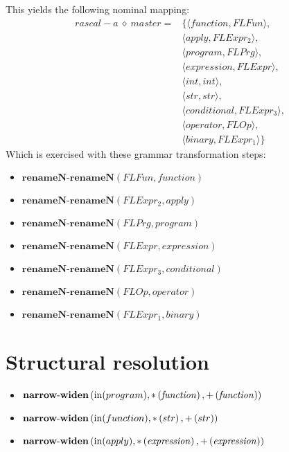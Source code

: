 This yields the following nominal mapping:
\begin{align*}\mathit{rascal-a} \:\diamond\: \mathit{master} =& \{\langle \mathit{function},\mathit{FLFun}\rangle,\\
 & \langle \mathit{apply},\mathit{FLExpr_2}\rangle,\\
 & \langle \mathit{program},\mathit{FLPrg}\rangle,\\
 & \langle \mathit{expression},\mathit{FLExpr}\rangle,\\
 & \langle int,int\rangle,\\
 & \langle str,str\rangle,\\
 & \langle \mathit{conditional},\mathit{FLExpr_3}\rangle,\\
 & \langle \mathit{operator},\mathit{FLOp}\rangle,\\
 & \langle \mathit{binary},\mathit{FLExpr_1}\rangle\}\end{align*}
 Which is exercised with these grammar transformation steps:

{\footnotesize\begin{itemize}
\item $\mathbf{renameN\text{-}renameN}\left(\mathit{FLFun},\mathit{function}\right)$
\item $\mathbf{renameN\text{-}renameN}\left(\mathit{FLExpr_2},\mathit{apply}\right)$
\item $\mathbf{renameN\text{-}renameN}\left(\mathit{FLPrg},\mathit{program}\right)$
\item $\mathbf{renameN\text{-}renameN}\left(\mathit{FLExpr},\mathit{expression}\right)$
\item $\mathbf{renameN\text{-}renameN}\left(\mathit{FLExpr_3},\mathit{conditional}\right)$
\item $\mathbf{renameN\text{-}renameN}\left(\mathit{FLOp},\mathit{operator}\right)$
\item $\mathbf{renameN\text{-}renameN}\left(\mathit{FLExpr_1},\mathit{binary}\right)$
\end{itemize}}

\section{Structural resolution}
{\footnotesize\begin{itemize}
\item $\mathbf{narrow\text{-}widen}\left(\mathrm{in}(program),\\{*}\left(\mathit{function}\right),\\{+}\left(\mathit{function}\right)\right)$
\item $\mathbf{narrow\text{-}widen}\left(\mathrm{in}(function),\\{*}\left(str\right),\\{+}\left(str\right)\right)$
\item $\mathbf{narrow\text{-}widen}\left(\mathrm{in}(apply),\\{*}\left(\mathit{expression}\right),\\{+}\left(\mathit{expression}\right)\right)$
\end{itemize}}
